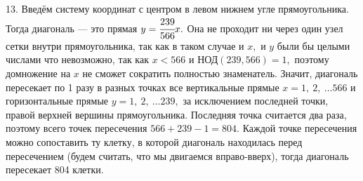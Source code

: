 13. Введём систему координат с центром в левом нижнем угле прямоугольника. Тогда диагональ --- это прямая $y=\cfrac{239}{566}x.$ Она не проходит ни через один узел сетки внутри прямоугольника, так как в таком случае и $x,$ и $y$ были бы целыми числами что невозможно, так как $x<566$ и $\text{НОД}(239,566)=1,$ поэтому домножение на $x$ не сможет сократить полностью знаменатель. Значит, диагональ пересекает по 1 разу в разных точках все вертикальные прямые $x=1,\ 2,\ \ldots 566$ и горизонтальные прямые $y=1,\ 2,\ \ldots 239,$ за исключением последней точки, правой верхней вершины прямоугольника. Последняя точка считается два раза, поэтому всего точек пересечения $566+239-1=804.$ Каждой точке пересечения можно сопоставить ту клетку, в которой диагональ находилась перед пересечением (будем считать, что мы двигаемся вправо-вверх), тогда диагональ пересекает 804 клетки.
\begin{figure}[ht!]
\end{figure}\\

